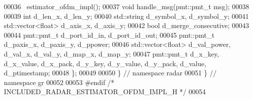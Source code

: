 \begin{DoxyCode}
00036       ~estimator_ofdm_impl();
00037       \textcolor{keywordtype}{void} handle_msg(pmt::pmt\_t msg);
00038       
00039       \textcolor{keywordtype}{int} d_len_x, d_len_y;
00040       std::string d_symbol_x, d_symbol_y;
00041       std::vector<float> d_axis_x, d_axis_y;
00042       \textcolor{keywordtype}{bool} d_merge_consecutive;
00043       
00044       pmt::pmt\_t d_port_id_in, d_port_id_out;
00045       pmt::pmt\_t d_paxis_x, d_paxis_y, d_ppower;
00046       std::vector<float> d_val_power, d_val_x, d_val_y, d_map_x, d_map_y;
00047       pmt::pmt\_t d_x_key, d_x_value, d_x_pack, d_y_key, d_y_value, d_y_pack, 
      d_value, d_ptimestamp;
00048     \};
00049 
00050   \} \textcolor{comment}{// namespace radar}
00051 \} \textcolor{comment}{// namespace gr}
00052 
00053 \textcolor{preprocessor}{#endif }\textcolor{comment}{/* INCLUDED\_RADAR\_ESTIMATOR\_OFDM\_IMPL\_H */}\textcolor{preprocessor}{}
00054 
\end{DoxyCode}

